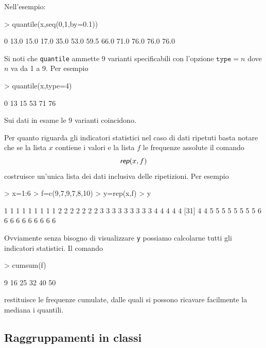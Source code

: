 \documentclass[onecolumn,11pt]{book}
\newcommand{\varia}[1]{\textsl{\textsf{#1}}}
\begin{document}
\begin{itemize}
Nell'esempio:
\begin{Schunk}
\begin{Sinput}
> quantile(x,seq(0,1,by=0.1))
\end{Sinput}
\begin{Soutput}
  0%
13.0 15.0 17.0 35.0 53.0 59.5 66.0 71.0 76.0 76.0 76.0 
\end{Soutput}
\end{Schunk}
Si noti che \texttt{quantile} ammette 9 varianti specificabili con l'opzione $\texttt{type}=n$ dove $n$ va da 1 a 9.
Per esempio
\begin{Schunk}
\begin{Sinput}
> quantile(x,type=4)
\end{Sinput}
\begin{Soutput}
  0%
  13   15   53   71   76 
\end{Soutput}
\end{Schunk}
Sui dati in esame le 9 varianti coincidono.
\end{itemize}
Per quanto riguarda gli indicatori statistici nel caso di dati ripetuti basta notare che se la lista $x$ contiene i valori e la lista $f$ le frequenze assolute il comando 
$$\varia{rep}(x,f)$$ costruisce un'unica lista dei dati inclusiva delle ripetizioni.
Per esempio 

\begin{Schunk}
\begin{Sinput}
> x=1:6
> f=c(9,7,9,7,8,10)
> y=rep(x,f)
> y
\end{Sinput}
\begin{Soutput}
 [1] 1 1 1 1 1 1 1 1 1 2 2 2 2 2 2 2 3 3 3 3 3 3 3 3 3 4 4 4 4 4
[31] 4 4 5 5 5 5 5 5 5 5 6 6 6 6 6 6 6 6 6 6
\end{Soutput}
\end{Schunk}
Ovviamente senza bisogno di visualizzare \texttt{y} possiamo calcolarne tutti gli indicatori statistici.
Il comando 
\begin{Schunk}
\begin{Sinput}
> cumsum(f)
\end{Sinput}
\begin{Soutput}
[1]  9 16 25 32 40 50
\end{Soutput}
\end{Schunk}
restituisce le frequenze cumulate, dalle quali si possono ricavare facilmente la mediana 
i quantili.

\subsection{Raggruppamenti in classi}
\end{document}
